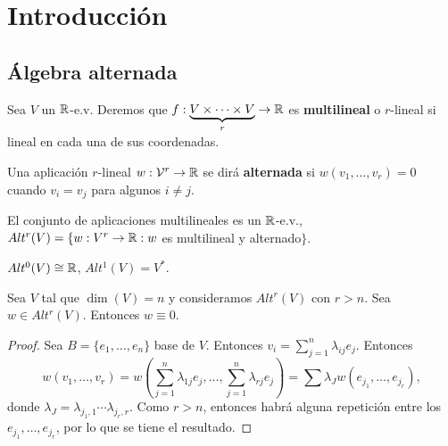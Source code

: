 \documentclass[cursovd_portada.tex]{subfiles}
\begin{document}

\chapter{Introducción}
\section{Álgebra alternada}
\begin{defi}
Sea $V$ un $\mathbb{R}$-e.v. Deremos que $f:\underbrace{V\times\dots\times V}_{r}\to\mathbb{R}$ es \textbf{multilineal} o $r$-lineal si lineal en cada una de sus coordenadas.

Una aplicación $r$-lineal $w:\mathcal{V}^r\to\mathbb{R}$ se dirá \textbf{alternada} si $w(v_1,\dots, v_r)=0$ cuando $v_i=v_j$ para algunos $i\neq j$. 
\end{defi}

El conjunto de aplicaciones multilineales es un $\mathbb{R}$-e.v., $Alt^r(V)=\{w:V^r\to\mathbb{R}: w$ es multilineal y alternado$\}$. 
\begin{ej}
$Alt^0(V)\cong\mathbb{R}$, $Alt^1(V)=V^*$.
\end{ej}

\begin{lemma}
Sea $V$ tal que $\dim(V)=n$ y consideramos $Alt^r(V)$ con $r>n$. Sea $w\in Alt^r(V)$. Entonces $w\equiv 0$.
\end{lemma}
\begin{proof}
Sea $B=\{e_1,\dots, e_n\}$ base de $V$. Entonces $v_i=\sum_{j=1}^n\lambda_{ij}e_j$. Entonces
$$
w(v_1,\dots, v_r)=w\left(\sum_{j=1}^n\lambda_{1j}e_j,\dots,\sum_{j=1}^n\lambda_{rj}e_j\right)=\sum\lambda_Jw(e_{j_1},\dots, e_{j_r}),$$
donde $\lambda_J=\lambda_{j_1,1}\cdots\lambda_{j_r,r}$. Como $r>n$, entonces habrá alguna repetición entre los $e_{j_1},\dots, e_{j_r}$, por lo que se tiene el resultado.
\end{proof}
\end{document}

